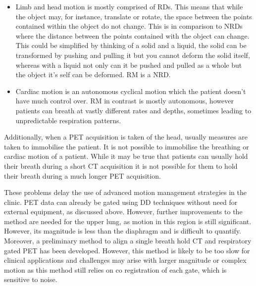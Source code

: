         \begin{itemize}
            \item Limb and head motion is mostly comprised of \gls{RD}s. This means that while the object may, for instance, translate or rotate, the space between the points contained within the object do not change. This is in comparison to \gls{NRD}s where the distance between the points contained with the object can change. This could be simplified by thinking of a solid and a liquid, the solid can be transformed by pushing and pulling it but you cannot deform the solid itself, whereas with a liquid not only can it be pushed and pulled as a whole but the object it's self can be deformed. \gls{RM} is a \gls{NRD}.
            
            \item Cardiac motion is an autonomous cyclical motion which the patient doesn't have much control over. \gls{RM} in contrast is mostly autonomous, however patients can breath at vastly different rates and depths, sometimes leading to unpredictable respiration patterns. %
        \end{itemize}
        
        Additionally, when a \gls{PET} acquisition is taken of the head, usually measures are taken to immobilise the patient. It is not possible to immobilise the breathing or cardiac motion of a patient. While it may be true that patients can usually hold their breath during a short \gls{CT} acquisition it is not possible for them to hold their breath during a much longer \gls{PET} acquisition.
        
        These problems delay the use of advanced motion management strategies in the clinic. \gls{PET} data can already be gated using \gls{DD} techniques without need for external equipment, as discussed above. However, further improvements to the method are needed for the upper lung, as motion in this region is still significant. However, its magnitude is less than the diaphragm and is difficult to quantify. Moreover, a preliminary method to align a single breath hold \gls{CT} and respiratory gated \gls{PET} has been developed. However, this method is likely to be too slow for clinical applications and challenges may arise with larger magnitude or complex motion as this method still relies on co registration of each gate, which is sensitive to noise.
        
